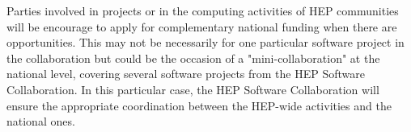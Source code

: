 \documentclass[11pt]{article} %
\begin{document}
Parties involved in projects or in the computing activities of HEP communities will be encourage to apply for complementary national
funding when there are opportunities. This may not be necessarily for one particular software project in the collaboration but could be
the occasion of a "mini-collaboration" at the national level, covering several software projects from the HEP Software Collaboration. In this
particular case, the HEP Software Collaboration will ensure the appropriate coordination between the HEP-wide activities and the national ones.
\end{document}

